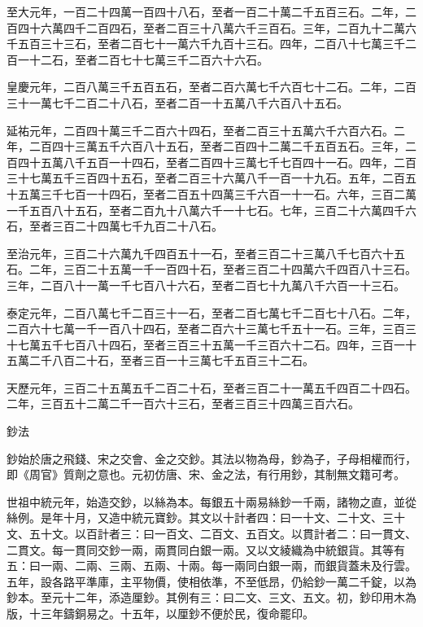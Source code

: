 \begin{pinyinscope}
 至大元年，一百二十四萬一百四十八石，至者一百二十萬二千五百三石。二年，二百四十六萬四千二百四石，至者二百三十八萬六千三百石。三年，二百九十二萬六千五百三十三石，至者二百七十一萬六千九百十三石。四年，二百八十七萬三千二百一十二石，至者二百七十七萬三千二百六十六石。



 皇慶元年，二百八萬三千五百五石，至者二百六萬七千六百七十二石。二年，二百三十一萬七千二百二十八石，至者二百一十五萬八千六百八十五石。



 延祐元年，二百四十萬三千二百六十四石，至者二百三十五萬六千六百六石。二年，二百四十三萬五千六百八十五石，至者二百四十二萬二千五百五石。三年，二百四十五萬八千五百一十四石，至者二百四十三萬七千七百四十一石。四年，二百三十七萬五千三百四十五石，至者二百三十六萬八千一百一十九石。五年，二百五十五萬三千七百一十四石，至者二百五十四萬三千六百一十一石。六年，三百二萬一千五百八十五石，至者二百九十八萬六千一十七石。七年，三百二十六萬四千六石，至者三百二十四萬七千九百二十八石。



 至治元年，三百二十六萬九千四百五十一石，至者三百二十三萬八千七百六十五石。二年，三百二十五萬一千一百四十石，至者三百二十四萬六千四百八十三石。三年，二百八十一萬一千七百八十六石，至者二百七十九萬八千六百一十三石。



 泰定元年，二百八萬七千二百三十一石，至者二百七萬七千二百七十八石。二年，二百六十七萬一千一百八十四石，至者二百六十三萬七千五十一石。三年，三百三十七萬五千七百八十四石，至者三百三十五萬一千三百六十二石。四年，三百一十五萬二千八百二十石，至者三百一十三萬七千五百三十二石。



 天歷元年，三百二十五萬五千二百二十石，至者三百二十一萬五千四百二十四石。二年，三百五十二萬二千一百六十三石，至者三百三十四萬三百六石。



 鈔法



 鈔始於唐之飛錢、宋之交會、金之交鈔。其法以物為母，鈔為子，子母相權而行，即《周官》質劑之意也。元初仿唐、宋、金之法，有行用鈔，其制無文籍可考。



 世祖中統元年，始造交鈔，以絲為本。每銀五十兩易絲鈔一千兩，諸物之直，並從絲例。是年十月，又造中統元寶鈔。其文以十計者四：曰一十文、二十文、三十文、五十文。以百計者三：曰一百文、二百文、五百文。以貫計者二：曰一貫文、二貫文。每一貫同交鈔一兩，兩貫同白銀一兩。又以文綾織為中統銀貨。其等有五：曰一兩、二兩、三兩、五兩、十兩。每一兩同白銀一兩，而銀貨蓋未及行雲。五年，設各路平準庫，主平物價，使相依準，不至低昂，仍給鈔一萬二千錠，以為鈔本。至元十二年，添造厘鈔。其例有三：曰二文、三文、五文。初，鈔印用木為版，十三年鑄銅易之。十五年，以厘鈔不便於民，復命罷印。




\end{pinyinscope}
